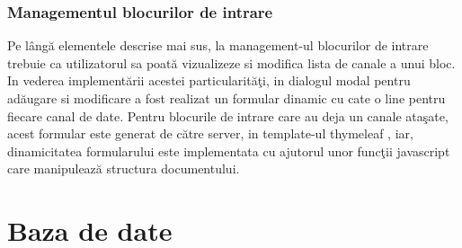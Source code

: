 \subsubsection{Managementul blocurilor de intrare}
Pe lângă elementele descrise mai sus, la management-ul blocurilor de intrare trebuie ca utilizatorul sa poată vizualizeze si modifica lista de canale a unui bloc. In vederea implementării acestei particularităţi, in dialogul modal pentru adăugare si modificare a fost realizat un formular dinamic cu cate o line pentru fiecare canal de date. Pentru blocurile de intrare care au deja un canale ataşate, acest formular este generat de către server, in template-ul thymeleaf , iar, dinamicitatea formularului este implementata cu ajutorul unor funcţii javascript care manipulează structura documentului.


\section{Baza de date}